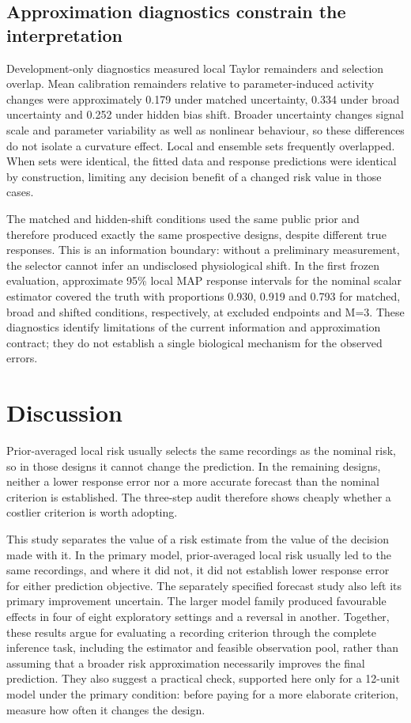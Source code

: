\subsection{Approximation diagnostics constrain the interpretation}

Development-only diagnostics measured local Taylor remainders and selection overlap. Mean calibration remainders relative to parameter-induced activity changes were approximately 0.179 under matched uncertainty, 0.334 under broad uncertainty and 0.252 under hidden bias shift. Broader uncertainty changes signal scale and parameter variability as well as nonlinear behaviour, so these differences do not isolate a curvature effect. Local and ensemble sets frequently overlapped. When sets were identical, the fitted data and response predictions were identical by construction, limiting any decision benefit of a changed risk value in those cases.

The matched and hidden-shift conditions used the same public prior and therefore produced exactly the same prospective designs, despite different true responses. This is an information boundary: without a preliminary measurement, the selector cannot infer an undisclosed physiological shift. In the first frozen evaluation, approximate 95\% local MAP response intervals for the nominal scalar estimator covered the truth with proportions 0.930, 0.919 and 0.793 for matched, broad and shifted conditions, respectively, at excluded endpoints and M=3. These diagnostics identify limitations of the current information and approximation contract; they do not establish a single biological mechanism for the observed errors.

\section{Discussion}

Prior-averaged local risk usually selects the same recordings as the nominal risk, so in those designs it cannot change the prediction. In the remaining designs, neither a lower response error nor a more accurate forecast than the nominal criterion is established. The three-step audit therefore shows cheaply whether a costlier criterion is worth adopting.

This study separates the value of a risk estimate from the value of the decision made with it. In the primary model, prior-averaged local risk usually led to the same recordings, and where it did not, it did not establish lower response error for either prediction objective. The separately specified forecast study also left its primary improvement uncertain. The larger model family produced favourable effects in four of eight exploratory settings and a reversal in another. Together, these results argue for evaluating a recording criterion through the complete inference task, including the estimator and feasible observation pool, rather than assuming that a broader risk approximation necessarily improves the final prediction. They also suggest a practical check, supported here only for a 12-unit model under the primary condition: before paying for a more elaborate criterion, measure how often it changes the design.

